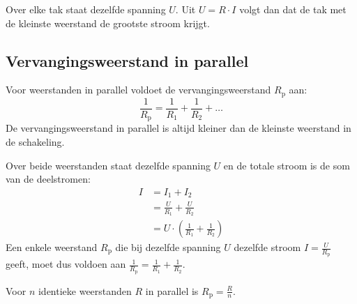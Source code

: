\documentclass{ximera}
\begin{document}
\begin{remark}[foldable=true,title={Kleinste weerstand, grootste stroom}]\nl
    Over elke tak staat dezelfde spanning $U$. Uit $U = R \cdot I$ volgt dan dat de tak met de kleinste weerstand de grootste stroom krijgt.
\end{remark}

\subsection{Vervangingsweerstand in parallel}
\begin{proposition}[title={Vervangingsweerstand in parallel}]\nl
    Voor weerstanden in parallel voldoet de vervangingsweerstand $R_{\text{p}}$ aan:
    \begin{equation*}
        \frac{1}{R_{\text{p}}} = \frac{1}{R_1} + \frac{1}{R_2} + \dots
    \end{equation*}
    De vervangingsweerstand in parallel is altijd kleiner dan de kleinste weerstand in de schakeling.
\end{proposition}

\begin{remark}[foldable=true,title={Afleiding voor twee weerstanden}]\nl
    Over beide weerstanden staat dezelfde spanning $U$ en de totale stroom is de som van de deelstromen:
    \begin{align*}
        I &= I_1 + I_2 \\
        &= \frac{U}{R_1} + \frac{U}{R_2} \\
        &= U \cdot \left(\frac{1}{R_1} + \frac{1}{R_2}\right)
    \end{align*}
    Een enkele weerstand $R_{\text{p}}$ die bij dezelfde spanning $U$ dezelfde stroom $I = \frac{U}{R_{\text{p}}}$ geeft, moet dus voldoen aan $\frac{1}{R_{\text{p}}} = \frac{1}{R_1} + \frac{1}{R_2}$.
\end{remark}

\begin{remark}[foldable=true,title={Identieke weerstanden in parallel}]\nl
    Voor $n$ identieke weerstanden $R$ in parallel is $R_{\text{p}} = \frac{R}{n}$.
\end{remark}
\end{document}
